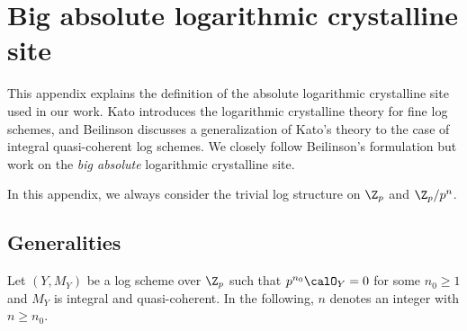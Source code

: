 \section{Big absolute logarithmic crystalline site} \label{sec:log-crystalline-site}

This appendix explains the definition of the absolute logarithmic crystalline site used in our work. Kato \cite[\S5, 6]{Kato-log} introduces the logarithmic crystalline theory for fine log schemes, and Beilinson \cite[\S1]{Beilinson-crystalline-period-map} discusses a generalization of Kato's theory to the case of integral quasi-coherent log schemes. We closely follow Beilinson's formulation but work on the \emph{big absolute} logarithmic crystalline site.

In this appendix, we always consider the trivial log structure on $\Z_p$ and $\Z_p/p^n$.

\subsection{Generalities}
Let $(Y,M_Y)$ be a log scheme over $\Z_p$ such that $p^{n_0}\calO_Y=0$ for some $n_0\geq 1$ and $M_Y$ is integral and quasi-coherent. In the following, $n$ denotes an integer with $n\geq n_0$.


